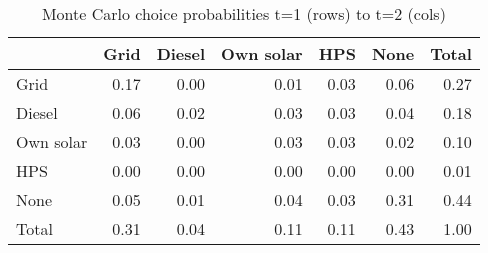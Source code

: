 \begin{table}[!ht]
	\centering
		\caption{Monte Carlo choice probabilities t=1 (rows) to t=2 (cols)}
\begin{tabular}{lrrrrrr}
		\toprule
               &      Grid&    Diesel& Own solar&       HPS&      None&     Total\\
		\midrule
		           Grid&      0.17&      0.00&      0.01&      0.03&      0.06&      0.27\\
		         Diesel&      0.06&      0.02&      0.03&      0.03&      0.04&      0.18\\
		      Own solar&      0.03&      0.00&      0.03&      0.03&      0.02&      0.10\\
		            HPS&      0.00&      0.00&      0.00&      0.00&      0.00&      0.01\\
		           None&      0.05&      0.01&      0.04&      0.03&      0.31&      0.44\\
		          Total&      0.31&      0.04&      0.11&      0.11&      0.43&      1.00\\
		\bottomrule
	\end{tabular}
\end{table}
